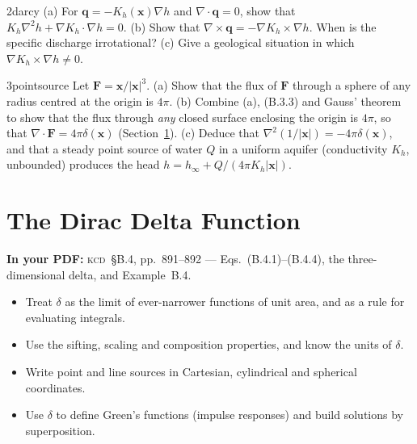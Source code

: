 \documentclass[11pt,letterpaper]{article}
\numberwithin{equation}{section}
\newcommand{\xx}{\mathbf{x}}
\newcommand{\qq}{\mathbf{q}}
\newcommand{\Kundu}{\textnormal{\textsc{kcd}}}   %
\begin{document}
\begin{exercise}{2}{darcy}
(a) For $\qq=-K_h(\xx)\nabla h$ and $\nabla\cdot\qq=0$, show that $K_h\nabla^2h+\nabla K_h\cdot\nabla h=0$.
(b) Show that $\nabla\times\qq=-\nabla K_h\times\nabla h$. When is the specific discharge irrotational?
(c) Give a geological situation in which $\nabla K_h\times\nabla h\neq0$.
\end{exercise}

\begin{exercise}{3}{pointsource}
Let $\mathbf F=\xx/|\xx|^3$.
(a) Show that the flux of $\mathbf F$ through a sphere of any radius centred at the origin is $4\pi$.
(b) Combine (a), (B.3.3) and Gauss' theorem to show that the flux through \emph{any} closed surface enclosing the origin
is $4\pi$, so that $\nabla\cdot\mathbf F=4\pi\delta(\xx)$ (Section~\ref{sec:B4}).
(c) Deduce that $\nabla^2(1/|\xx|)=-4\pi\delta(\xx)$, and that a steady point source of water $Q$ in a uniform aquifer
(conductivity $K_h$, unbounded) produces the head $h=h_\infty+Q/(4\pi K_h|\xx|)$.
\end{exercise}

\clearpage
\section{The Dirac Delta Function}\label{sec:B4}
\begin{source}
\textbf{In your PDF:} \Kundu\ \S B.4, pp.~891--892 --- Eqs.~(B.4.1)--(B.4.4), the three-dimensional delta, and
Example~B.4.
\end{source}

\begin{goals}
\begin{itemize}
  \item Treat $\delta$ as the limit of ever-narrower functions of unit area, and as a rule for evaluating integrals.
  \item Use the sifting, scaling and composition properties, and know the units of $\delta$.
  \item Write point and line sources in Cartesian, cylindrical and spherical coordinates.
  \item Use $\delta$ to define Green's functions (impulse responses) and build solutions by superposition.
\end{itemize}
\end{goals}
\end{document}
